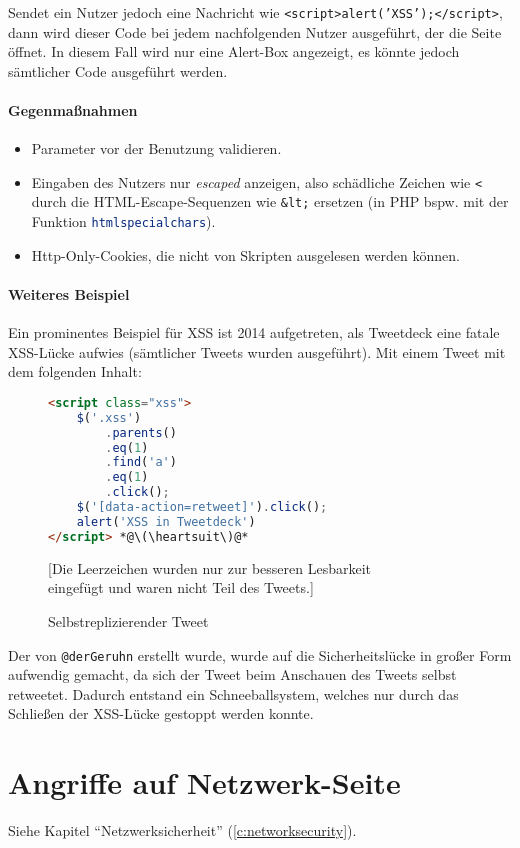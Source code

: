 					Sendet ein Nutzer jedoch eine Nachricht wie \texttt{<script>alert('XSS');</script>}, dann wird dieser Code bei jedem nachfolgenden Nutzer ausgeführt, der die Seite öffnet. In diesem Fall wird nur eine Alert-Box angezeigt, es könnte jedoch sämtlicher Code ausgeführt werden.

				\paragraph{Gegenmaßnahmen}
					\begin{itemize}
						\item Parameter vor der Benutzung validieren.
						\item Eingaben des Nutzers nur \textit{escaped} anzeigen, also schädliche Zeichen wie \texttt{<} durch die HTML-Escape-Sequenzen wie \texttt{\&lt;} ersetzen (in PHP bspw. mit der Funktion \lstinline[language = PHP]|htmlspecialchars|).
						\item Http-Only-Cookies, die nicht von Skripten ausgelesen werden können.
					\end{itemize}

				\paragraph{Weiteres Beispiel}
					Ein prominentes Beispiel für XSS ist 2014 aufgetreten, als Tweetdeck eine fatale XSS-Lücke aufwies (sämtlicher Tweets wurden ausgeführt). Mit einem Tweet mit dem folgenden Inhalt:
					\begin{figure}[H]
						\centering
						\begin{lstlisting}[language = HTML]
<script class="xss">
	$('.xss')
		.parents()
		.eq(1)
		.find('a')
		.eq(1)
		.click();
	$('[data-action=retweet]').click();
	alert('XSS in Tweetdeck')
</script> *@\(\heartsuit\)@*
\end{lstlisting}
						[Die Leerzeichen wurden nur zur besseren Lesbarkeit \\ eingefügt und waren nicht Teil des Tweets.]
						\caption{Selbstreplizierender Tweet}
					\end{figure}
					Der von \texttt{@derGeruhn} erstellt wurde, wurde auf die Sicherheitslücke in großer Form aufwendig gemacht, da sich der Tweet beim Anschauen des Tweets selbst retweetet. Dadurch entstand ein Schneeballsystem, welches nur durch das Schließen der XSS-Lücke gestoppt werden konnte.

\section{Angriffe auf Netzwerk-Seite}
	Siehe Kapitel \enquote{Netzwerksicherheit} (\ref{c:networksecurity}).

